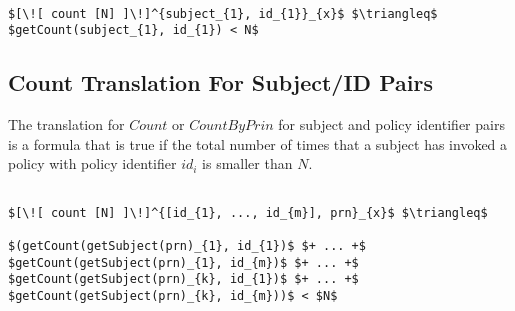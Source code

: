 \lstset{mathescape, language=AST}  
\begin{lstlisting}[frame=single, caption={Count Translation {$\colon$} subject and policyId pair},label={lst:transcountSinglePair}]

$[\![ count [N] ]\!]^{subject_{1}, id_{1}}_{x}$ $\triangleq$ $getCount(subject_{1}, id_{1}) < N$
\end{lstlisting}

\subsection{Count Translation For Subject/ID Pairs}
The translation for $Count$ or $CountByPrin$ for subject and policy identifier pairs is a formula that is true if the total number of times that a subject has invoked a policy with policy identifier $id_{i}$ is smaller than $N$.

\lstset{mathescape, language=AST}  
\begin{lstlisting}[frame=single, caption={Count Translation {$\colon$} subject and policyId pairs},label={lst:transcountPairs}]

$[\![ count [N] ]\!]^{[id_{1}, ..., id_{m}], prn}_{x}$ $\triangleq$ 

$(getCount(getSubject(prn)_{1}, id_{1})$ $+ ... +$ $getCount(getSubject(prn)_{1}, id_{m})$ $+ ... +$ $getCount(getSubject(prn)_{k}, id_{1})$ $+ ... +$ $getCount(getSubject(prn)_{k}, id_{m}))$ < $N$


\end{lstlisting}



